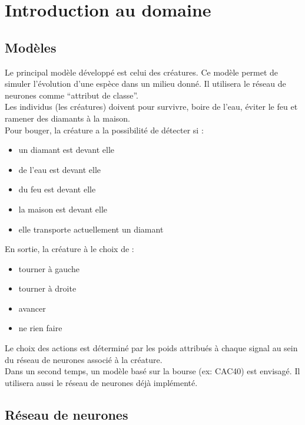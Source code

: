 \chapter{Introduction au domaine}

\section{Modèles}
Le principal modèle développé est celui des créatures.
Ce modèle permet de simuler l'évolution d'une espèce dans un milieu donné.
Il utilisera le réseau de neurones comme ``attribut de classe''.\\
Les individus (les créatures) doivent pour survivre, boire de l'eau, éviter le feu et ramener des diamants à la maison.
\\Pour bouger, la créature a la possibilité de détecter si :\\

\begin{itemize}
 \item un diamant est devant elle
 \item de l'eau est devant elle
 \item du feu est devant elle
 \item la maison est devant elle
 \item elle transporte actuellement un diamant\\
\end{itemize}

En sortie, la créature à le choix de :
\begin{itemize}
 \item tourner à gauche
 \item tourner à droite
 \item avancer
 \item ne rien faire\\
 
\end{itemize}
 
Le choix des actions est déterminé par les poids attribués à chaque signal au sein du réseau de neurones associé à la créature.\\

Dans un second temps, un modèle basé sur la bourse (ex: CAC40) est envisagé.
Il utilisera aussi le réseau de neurones déjà implémenté.
\clearpage
\section{Réseau de neurones}

